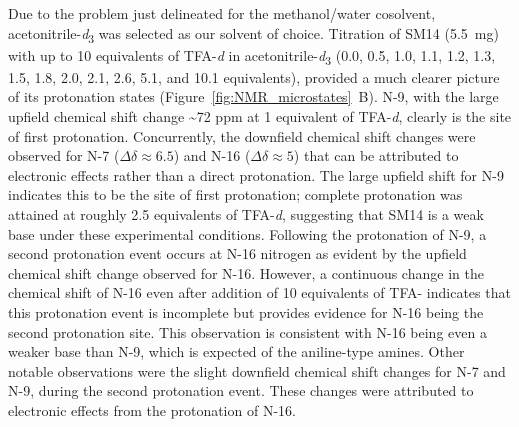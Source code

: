 \documentclass[9pt,lineno]{elife}
\begin{document}
Due to the problem just delineated for the methanol/water cosolvent, acetonitrile-\textit{d}\textsubscript{3} was selected as our solvent of choice. 
Titration of SM14 (5.5~mg) with up to 10 equivalents of TFA-\textit{d} in acetonitrile-\textit{d}\textsubscript{3} (0.0, 0.5, 1.0, 1.1, 1.2, 1.3, 1.5, 1.8, 2.0, 2.1, 2.6, 5.1, and 10.1 equivalents), provided a much clearer picture of its protonation states (Figure~\ref{fig:NMR_microstates}~B). N-9, with the large upfield chemical shift change \textasciitilde72 ppm at 1 equivalent of TFA-\textit{d}, clearly is the site of first protonation. 
Concurrently, the downfield chemical shift changes were observed for N-7 ($\Delta\delta \approx 6.5$) and N-16 ($\Delta\delta \approx 5$) that can be attributed to electronic effects rather than a direct protonation. 
The large upfield shift for N-9 indicates this to be the site of first protonation; complete protonation was attained at roughly 2.5 equivalents of TFA-\textit{d}, suggesting that SM14 is a weak base under these experimental conditions. Following the protonation of N-9, a second protonation event occurs at N-16 nitrogen as evident by the upfield chemical shift change observed for N-16. 
However, a continuous change in the chemical shift of N-16 even after addition of 10 equivalents of TFA- indicates that this protonation event is incomplete but provides evidence for N-16 being the second protonation site. This observation is consistent with N-16 being even a weaker base than N-9, which is expected of the aniline-type amines. 
Other notable observations were the slight downfield chemical shift changes for N-7 and N-9, during the second protonation event. 
These changes were attributed to electronic effects from the protonation of N-16.
\end{document}

